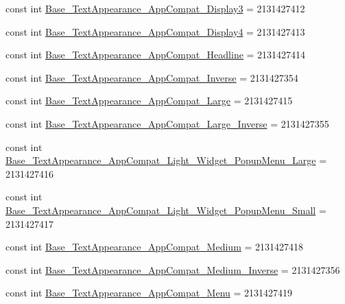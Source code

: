 \begin{DoxyCompactItemize}
const int \mbox{\hyperlink{class_f_w_p_s___app_1_1_droid_1_1_resource_1_1_style_a0537bb3f0161c398ea863779e404d2e5}{Base\+\_\+\+Text\+Appearance\+\_\+\+App\+Compat\+\_\+\+Display3}} = 2131427412
\item 
const int \mbox{\hyperlink{class_f_w_p_s___app_1_1_droid_1_1_resource_1_1_style_a07eda154526359c62cbf39375f053d7e}{Base\+\_\+\+Text\+Appearance\+\_\+\+App\+Compat\+\_\+\+Display4}} = 2131427413
\item 
const int \mbox{\hyperlink{class_f_w_p_s___app_1_1_droid_1_1_resource_1_1_style_a221e0672858a7864232c659e2a532b58}{Base\+\_\+\+Text\+Appearance\+\_\+\+App\+Compat\+\_\+\+Headline}} = 2131427414
\item 
const int \mbox{\hyperlink{class_f_w_p_s___app_1_1_droid_1_1_resource_1_1_style_a64f43adb350d154a10cd66782667445a}{Base\+\_\+\+Text\+Appearance\+\_\+\+App\+Compat\+\_\+\+Inverse}} = 2131427354
\item 
const int \mbox{\hyperlink{class_f_w_p_s___app_1_1_droid_1_1_resource_1_1_style_a2163e96d14c6a2f9a311c1872c44dee4}{Base\+\_\+\+Text\+Appearance\+\_\+\+App\+Compat\+\_\+\+Large}} = 2131427415
\item 
const int \mbox{\hyperlink{class_f_w_p_s___app_1_1_droid_1_1_resource_1_1_style_a01ab09181e822cc72621f5cf686ccd58}{Base\+\_\+\+Text\+Appearance\+\_\+\+App\+Compat\+\_\+\+Large\+\_\+\+Inverse}} = 2131427355
\item 
const int \mbox{\hyperlink{class_f_w_p_s___app_1_1_droid_1_1_resource_1_1_style_ad2ad43054033bc379ed6ce422262addf}{Base\+\_\+\+Text\+Appearance\+\_\+\+App\+Compat\+\_\+\+Light\+\_\+\+Widget\+\_\+\+Popup\+Menu\+\_\+\+Large}} = 2131427416
\item 
const int \mbox{\hyperlink{class_f_w_p_s___app_1_1_droid_1_1_resource_1_1_style_acfa8812f442fdfb446e1516a009399f6}{Base\+\_\+\+Text\+Appearance\+\_\+\+App\+Compat\+\_\+\+Light\+\_\+\+Widget\+\_\+\+Popup\+Menu\+\_\+\+Small}} = 2131427417
\item 
const int \mbox{\hyperlink{class_f_w_p_s___app_1_1_droid_1_1_resource_1_1_style_a9c9edacaed03c1b701b11b5500dfcdb3}{Base\+\_\+\+Text\+Appearance\+\_\+\+App\+Compat\+\_\+\+Medium}} = 2131427418
\item 
const int \mbox{\hyperlink{class_f_w_p_s___app_1_1_droid_1_1_resource_1_1_style_a1793c66e5e6e76a8dbdb3cc2155ece51}{Base\+\_\+\+Text\+Appearance\+\_\+\+App\+Compat\+\_\+\+Medium\+\_\+\+Inverse}} = 2131427356
\item 
const int \mbox{\hyperlink{class_f_w_p_s___app_1_1_droid_1_1_resource_1_1_style_a01100d7f1ee9ca8893f9655951bc59f4}{Base\+\_\+\+Text\+Appearance\+\_\+\+App\+Compat\+\_\+\+Menu}} = 2131427419

\end{DoxyCompactItemize}
